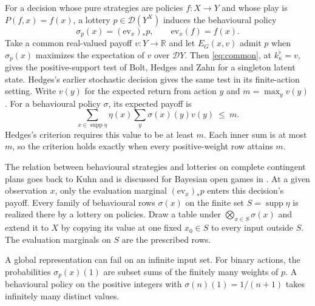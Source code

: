 \documentclass[11pt,a4paper]{article}
\theoremstyle{definition}
\newcommand{\D}{\mathcal D}
\newcommand{\supp}{\operatorname{supp}}
\begin{document}
For a decision whose pure strategies are policies $f:X\to Y$ and whose play is $P(f,x)=f(x)$, a lottery $p\in\D(Y^X)$ induces the behavioural policy
\[
    \sigma_p(x)=(\mathrm{ev}_x)_*p,\qquad
    \mathrm{ev}_x(f)=f(x).
\]
Take a common real-valued payoff $v:Y\to\mathbb R$ and let $E_G(x,v)$ admit $p$ when $\sigma_p(x)$ maximizes the expectation of $v$ over $\D Y$. Then \eqref{eq:common}, at $k^\flat_\kappa=v$, gives the positive-support test of Bolt, Hedges and Zahn \cite[Definition~4.4.1]{bolt} for a singleton latent state. Hedges's earlier stochastic decision \cite[Section~2.1.8]{hedges} gives the same test in its finite-action setting. Write $v(y)$ for the expected return from action $y$ and $m=\max_y v(y)$. For a behavioural policy $\sigma$, its expected payoff is
\[
    \sum_{x\in\supp\eta}\eta(x)\sum_y\sigma(x)(y)v(y)\ \leq\ m .
\]
Hedges's criterion requires this value to be at least $m$. Each inner sum is at most $m$, so the criterion holds exactly when every positive-weight row attains $m$.

The relation between behavioural strategies and lotteries on complete contingent plans goes back to Kuhn \cite{kuhn} and is discussed for Bayesian open games in \cite[Section~4.6, footnote~5]{bolt}. At a given observation $x$, only the evaluation marginal $(\mathrm{ev}_x)_*p$ enters this decision's payoff. Every family of behavioural rows $\sigma(x)$ on the finite set $S=\supp\eta$ is realized there by a lottery on policies. Draw a table under $\bigotimes_{x\in S}\sigma(x)$ and extend it to $X$ by copying its value at one fixed $x_0\in S$ to every input outside $S$. The evaluation marginals on $S$ are the prescribed rows.

A global representation can fail on an infinite input set. For binary actions, the probabilities $\sigma_p(x)(1)$ are subset sums of the finitely many weights of $p$. A behavioural policy on the positive integers with $\sigma(n)(1)=1/(n+1)$ takes infinitely many distinct values.
\end{document}
